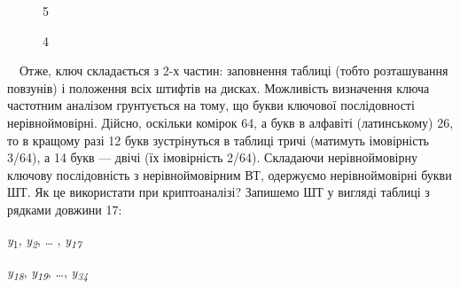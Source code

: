 \begin{figure}
\centering
\begin{minipage}{1in}
 5
\end{minipage}
\end{figure}
\begin{figure}
\centering
\begin{minipage}{0.1252in}
4
\end{minipage}
\end{figure}
\begin{figure}
\centering
\begin{minipage}{0.2209in}

\bigskip
\end{minipage}
\end{figure}
\begin{figure}
\centering
\begin{minipage}{0.3252in}

\bigskip
\end{minipage}
\end{figure}
\begin{figure}
\centering
\begin{minipage}{0.1957in}

\bigskip
\end{minipage}
\end{figure}
\begin{figure}
\centering
\begin{minipage}{0.4374in}

\bigskip
\end{minipage}
\end{figure}
\ \ Отже, ключ складається з 2-х частин: заповнення таблиці (тобто розташування
повзунів) і положення всіх штифтів на дисках. Можливість визначення ключа
частотним аналізом грунтується на тому, що букви ключової послідовності
нерівноймовірні. Дійсно, оскільки комірок 64, а букв в алфавіті (латинському)
26, то в кращому разі 12 букв зустрінуться в таблиці тричі (матимуть
імовірність 3/64), а 14 букв --- двічі (їх імовірність 2/64). Складаючи
нерівноймовірну ключову послідовність з нерівноймовірним ВТ, одержуємо
нерівноймовірні букви ШТ. Як це використати при криптоаналізі? Запишемо ШТ у
вигляді таблиці з рядками довжини 17:

{\centering
\textit{y}\textsubscript{1},  \textit{y}\textit{\textsubscript{2}}, … ,\textit{ 
y}\textit{\textsubscript{17}}
\par}

{\centering
\textit{y}\textit{\textsubscript{18}},  \textsubscript{
}\textit{y}\textit{\textsubscript{19}}, …,
\textit{y}\textit{\textsubscript{34}}
\par}


